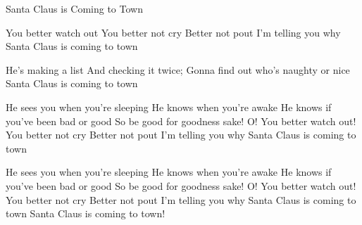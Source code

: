 \begin{sang}{Santa Claus is Coming to Town}{}
\begin{vers}
You better watch out
You better not cry
Better not pout
I'm telling you why
Santa Claus is coming to town
\end{vers}
\begin{vers}
He's making a list
And checking it twice;
Gonna find out who's naughty or nice
Santa Claus is coming to town
\end{vers}
\begin{vers}
He sees you when you're sleeping
He knows when you're awake
He knows if you've been bad or good
So be good for goodness sake!
O! You better watch out!
You better not cry
Better not pout
I'm telling you why
Santa Claus is coming to town
\end{vers}
\begin{vers}
He sees you when you're sleeping
He knows when you're awake
He knows if you've been bad or good
So be good for goodness sake!
O! You better watch out!
You better not cry
Better not pout
I'm telling you why
Santa Claus is coming to town
Santa Claus is coming to town!
\end{vers}
\end{sang}
